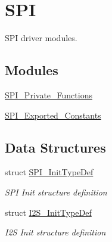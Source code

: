 \hypertarget{group___s_p_i}{}\section{S\+PI}
\label{group___s_p_i}


S\+PI driver modules.  


\subsection*{Modules}
\begin{DoxyCompactItemize}
\item 
\mbox{\hyperlink{group___s_p_i___private___functions}{S\+P\+I\+\_\+\+Private\+\_\+\+Functions}}
\item 
\mbox{\hyperlink{group___s_p_i___exported___constants}{S\+P\+I\+\_\+\+Exported\+\_\+\+Constants}}
\end{DoxyCompactItemize}
\subsection*{Data Structures}
\begin{DoxyCompactItemize}
\item 
struct \mbox{\hyperlink{struct_s_p_i___init_type_def}{S\+P\+I\+\_\+\+Init\+Type\+Def}}
\begin{DoxyCompactList}\small\item\em S\+PI Init structure definition ~\newline
 \end{DoxyCompactList}\item 
struct \mbox{\hyperlink{struct_i2_s___init_type_def}{I2\+S\+\_\+\+Init\+Type\+Def}}
\begin{DoxyCompactList}\small\item\em I2S Init structure definition ~\newline
 \end{DoxyCompactList}\end{DoxyCompactItemize}
